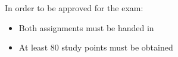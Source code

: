 In order to be approved for the exam:
\begin{itemize}
	\item Both assignments must be handed in
	\item At least 80 study points must be obtained
\end{itemize}
